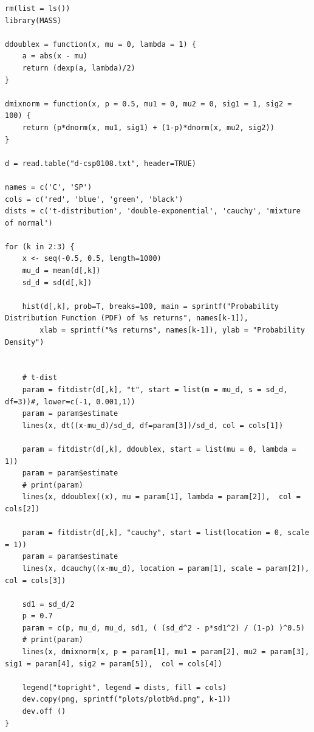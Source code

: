 \documentclass{article}
\begin{document}
\begin{lstlisting}
rm(list = ls())
library(MASS)

ddoublex = function(x, mu = 0, lambda = 1) {
	a = abs(x - mu)
	return (dexp(a, lambda)/2)
}

dmixnorm = function(x, p = 0.5, mu1 = 0, mu2 = 0, sig1 = 1, sig2 = 100) {
	return (p*dnorm(x, mu1, sig1) + (1-p)*dnorm(x, mu2, sig2))
}

d = read.table("d-csp0108.txt", header=TRUE)

names = c('C', 'SP')
cols = c('red', 'blue', 'green', 'black')
dists = c('t-distribution', 'double-exponential', 'cauchy', 'mixture of normal')

for (k in 2:3) {
	x <- seq(-0.5, 0.5, length=1000)
	mu_d = mean(d[,k])
	sd_d = sd(d[,k])

	hist(d[,k], prob=T, breaks=100, main = sprintf("Probability Distribution Function (PDF) of %s returns", names[k-1]), 
		xlab = sprintf("%s returns", names[k-1]), ylab = "Probability Density")
	
	
	# t-dist	
	param = fitdistr(d[,k], "t", start = list(m = mu_d, s = sd_d, df=3))#, lower=c(-1, 0.001,1))
	param = param$estimate
	lines(x, dt((x-mu_d)/sd_d, df=param[3])/sd_d, col = cols[1])

	param = fitdistr(d[,k], ddoublex, start = list(mu = 0, lambda = 1))
	param = param$estimate
	# print(param)
	lines(x, ddoublex((x), mu = param[1], lambda = param[2]),  col = cols[2])

	param = fitdistr(d[,k], "cauchy", start = list(location = 0, scale = 1))
	param = param$estimate
	lines(x, dcauchy((x-mu_d), location = param[1], scale = param[2]),  col = cols[3])

	sd1 = sd_d/2
	p = 0.7
	param = c(p, mu_d, mu_d, sd1, ( (sd_d^2 - p*sd1^2) / (1-p) )^0.5)
	# print(param)
	lines(x, dmixnorm(x, p = param[1], mu1 = param[2], mu2 = param[3], sig1 = param[4], sig2 = param[5]),  col = cols[4])

	legend("topright", legend = dists, fill = cols)
	dev.copy(png, sprintf("plots/plotb%d.png", k-1))
	dev.off ()
}
\end{lstlisting}
\end{document}
